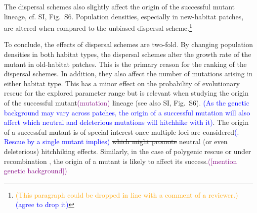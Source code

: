\documentclass[11pt]{article}
\newcommand{\florence}[1]{\textcolor{purple}{(#1)}} %
\newcommand{\francois}[1]{\textcolor{blue}{(#1)}}
\newcommand{\pete}[1]{\textcolor{orange}{(#1)}}
\newcommand{\chg}[1]{\textcolor{change}{#1}}
\begin{document}
The dispersal schemes also slightly affect the origin of the successful mutant lineage, cf. SI, Fig.~S6. Population densities, especially in new-habitat patches, are altered when compared to the \chg{unbiased} dispersal scheme.\footnote{\pete{This paragraph could be dropped in line with a comment of a reviewer.} \francois{agree to drop it}}

To conclude, the effects of dispersal schemes are two-fold. By changing population densities in both habitat types, the dispersal schemes \chg{alter} the growth rate of the mutant in old-habitat patches. 
This is the primary reason for the ranking of the dispersal schemes. In addition, they also affect the number of mutations arising in either habitat type. This has a minor effect on the probability of evolutionary rescue for the explored parameter range but is relevant when studying the origin of the successful mutant\florence{mutation} lineage \chg{(see also SI, Fig.~S6)}. \francois{As the genetic background may vary across patches, the origin of a successful mutation will also affect which neutral and deleterious mutations will hitchhike with it}. \chg{The origin of a successful mutant is of special interest once multiple loci are considered\francois{. Rescue by a single mutant implies} \st{which might promote} neutral (or even deleterious) hitchhiking effects. Similarly, in the case of polygenic rescue or under recombination \citep[e.g.][]{uecker_2015}, the origin of a mutant is likely to affect its success.}\florence{[mention genetic background]}    

\end{document}
